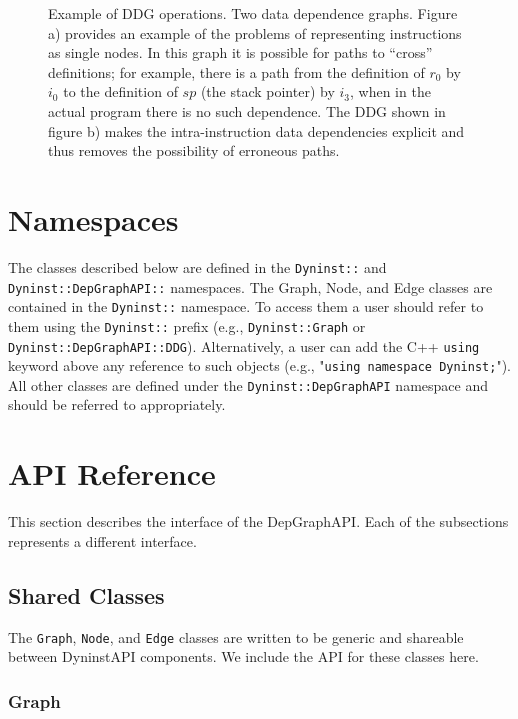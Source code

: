 \documentclass[12pt,titlepage]{article}
\begin{document}
\begin{figure}
\begin{center}
\caption{Example of DDG operations.  Two data dependence
graphs. Figure a) provides an example of the problems of representing
instructions as single nodes. In this graph it is possible for paths
to ``cross'' definitions; for example, there is a path from the
definition of $r_0$ by $i_0$ to the definition of $sp$ (the stack pointer) by
$i_3$, when in the actual program there is no such dependence. The DDG
shown in figure b) makes the intra-instruction data dependencies
explicit and thus removes the possibility of erroneous paths.}
\end{center}
\label{Operations}
\end{figure}

\section{Namespaces}

The classes described below are defined in the \texttt{Dyninst::} and
\texttt{Dyninst::DepGraphAPI::} namespaces. The Graph, Node, and Edge
classes are contained in the \texttt{Dyninst::} namespace.  To access
them a user should refer to them using the \texttt{Dyninst::} prefix
(e.g., \texttt{Dyninst::Graph} or
\texttt{Dyninst::DepGraphAPI::DDG}). Alternatively, a user can add the
C++ \texttt{using} keyword above any reference to such objects (e.g.,
"\texttt{using namespace Dyninst;}"). All other classes are defined
under the \texttt{Dyninst::DepGraphAPI} namespace and should be
referred to appropriately.

\section{API Reference}

This section describes the interface of the DepGraphAPI. Each of the
subsections represents a different interface.
        
\subsection{Shared Classes}

The \texttt{Graph}, \texttt{Node}, and \texttt{Edge} classes are written to be generic and
shareable between DyninstAPI components. We include the API for these
classes here.

\subsubsection{Graph}
\end{document}
